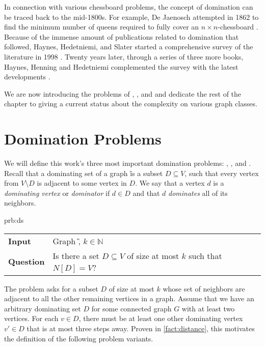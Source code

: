 In connection with various chessboard problems, the concept of domination can be traced back to the mid-1800s.
For example, De Jaenosch attempted in 1862 to find the minimum number of queens required to fully cover an $n \times n$-chessboard \cite{Jaenisch1862}.
Because of the immense amount of publications related to domination that followed, Haynes, Hedetniemi, and Slater started a comprehensive survey of the literature in 1998 \cite{Haynes1998, Haynes1998b}. 
Twenty years later, through a series of three more books, Haynes, Henning and Hedetniemi complemented the survey with the latest developments \cite{Haynes2020, Haynes2021, Haynes2022}.

We are now introducing the problems of \dom, \sdom, and \tdom and dedicate the rest of the chapter to giving a current status about the complexity on various graph classes. 

\section{Domination Problems}

We will define this work's three most important domination problems: \dom, \sdom, and \tdom.
Recall that a dominating set of a graph \G is a subset $D \subseteq V$, such that every vertex from $V \setminus D$ is adjacent to some vertex in $D$.
We say that a vertex $d$ is a \textit{dominating vertex} or \textit{dominator} if $d \in D$ and that $d$ \textit{dominates} all of its neighbors.

\begin{prb}{prb:ds}
    \begin{tabularx}{1.0\textwidth}{>{\hsize=0.30\hsize}X>{\hsize=0.8\hsize}X}
        \textbf{Input} & Graph \G, $k \in \mathbb{N}$\\
        \textbf{Question} & Is there a set {$D \subseteq V$} of size at most $k$ such that ${N[D] = V}$? \\
    \end{tabularx}
\end{prb}

The \dom problem asks for a subset $D$ of size at most $k$ whose set of neighbors are adjacent to all the other remaining vertices in a graph.
Assume that we have an arbitrary dominating set $D$ for some connected graph $G$ with at least two vertices.
For each $v \in D$, there must be at least one other dominating vertex $v' \in D$ that is at most three steps away.
Proven in \cref{fact:distance}, this motivates the definition of the following problem variants.

